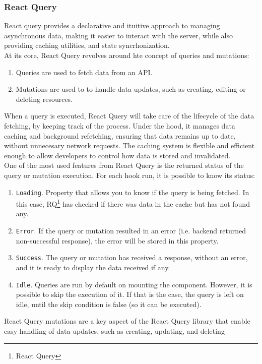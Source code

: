 \documentclass[./memory.tex]{subfiles}
\begin{document}
\subsubsection{React Query}
React query provides a declarative and ituitive approach to managing
asynchronous data, making it easier to interact with the server, while also
providing caching utilities, and state syncrhonization.
\\[8pt]
At its core, React Query revolves around hte concept of queries and mutations:
\begin{enumerate}[label = -]
	\item Queries are used to fetch data from an API.
	\item Mutations are used to to handle data updates, such as creating, editing
	      or deleting resources.
\end{enumerate}
When a query is executed, React Query will take care of the lifecycle of the
data fetching, by keeping track of the process. Under the hood, it manages data
caching and background refetching, ensuring that data remains up to date,
without unnecesary network requests. The caching system is flexible and
efficient enough to allow developers to control how data is stored and
invalidated.
\\
One of the most used features from React Query is the returned status of the
query or mutation execution. For each hook run, it is possible to know its
status:
\begin{enumerate}[label = -]
	\item\texttt{Loading}. Property that allows you to know if the query is
	being fetched. In this case, RQ\footnote{React Query} has checked if there
	was data in the cache but has not found any.
	\item\texttt{Error}. If the query or mutation resulted in an error (i.e.
	backend returned non-successful response), the error will be stored in this
	property.
	\item\texttt{Success}. The query or mutation has received a response, without
	an error, and it is ready to display the data received if any.
	\item\texttt{Idle}. Queries are run by default on mounting the component.
	However, it is possible to skip the execution of it. If that is the case,
	the query is left on idle, until the skip condition is false (so it can be
	executed).
\end{enumerate}
React Query mutations are a key aspect of the React Query library that enable
easy handling of data updates, such as creating, updating, and deleting
\end{document}
